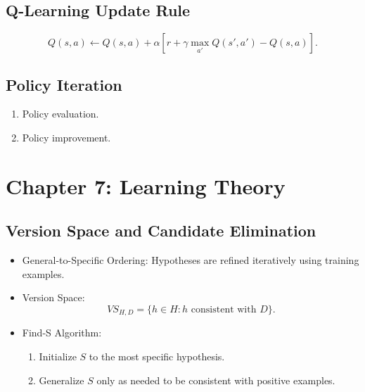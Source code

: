 \documentclass[10pt,a4paper]{article}
\begin{document}
\subsection*{Q-Learning Update Rule}
\[
Q(s, a) \leftarrow Q(s, a) + \alpha \left[ r + \gamma \max_{a'} Q(s', a') - Q(s, a) \right].
\]

\subsection*{Policy Iteration}
\begin{enumerate}
    \item Policy evaluation.
    \item Policy improvement.
\end{enumerate}

\section*{Chapter 7: Learning Theory}
\subsection*{Version Space and Candidate Elimination}
\begin{itemize}
    \item General-to-Specific Ordering: Hypotheses are refined iteratively using training examples.
    \item Version Space:
    \[
    VS_{H,D} = \{ h \in H : h \text{ consistent with } D \}.
    \]
    \item Find-S Algorithm:
    \begin{enumerate}
        \item Initialize \( S \) to the most specific hypothesis.
        \item Generalize \( S \) only as needed to be consistent with positive examples.
    \end{enumerate}
\end{itemize}
\end{document}
